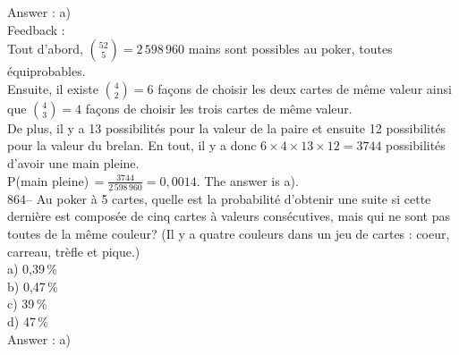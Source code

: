 ﻿\documentclass[letterpaper, 12pt]{article}
\begin{document}
Answer : a)\\

Feedback : \\
Tout d'abord, $\binom{52}{5}=2\,598\,960$ mains sont possibles au poker,
toutes \'equiprobables.  \\[2mm]
Ensuite, il existe $\binom{4}{2}=6$ fa\c cons de choisir les deux
cartes de m\^eme valeur ainsi que $\binom{4}{3}=4$ fa\c cons de choisir les
trois cartes de m\^eme valeur.  \\[2mm]
De plus, il y a 13 possibilit\'es pour la valeur de la paire et ensuite 12
possibilit\'es pour la valeur du brelan.  En tout, il y a donc
$6\times4\times13\times12=3744$ possibilit\'es d'avoir une main pleine.
\\[2mm]
P(main pleine)$\,=\frac{3744}{2\,598\,960}=0,0014$.  The answer is
a).\\[2mm]

864-- Au poker \`a 5 cartes, quelle est la probabilit\'e d'obtenir une suite
si cette derni\`ere est compos\'ee de cinq cartes \`a valeurs
cons\'ecutives, mais qui ne sont pas toutes de la m\^eme couleur? (Il y a
quatre couleurs dans un jeu de cartes : coeur, carreau, tr\`efle et
pique.)\\
a) 0,39\,\%\\
b) 0,47\,\%\\
c) 39\,\%\\
d) 47\,\%\\

Answer : a)\\
\end{document}
